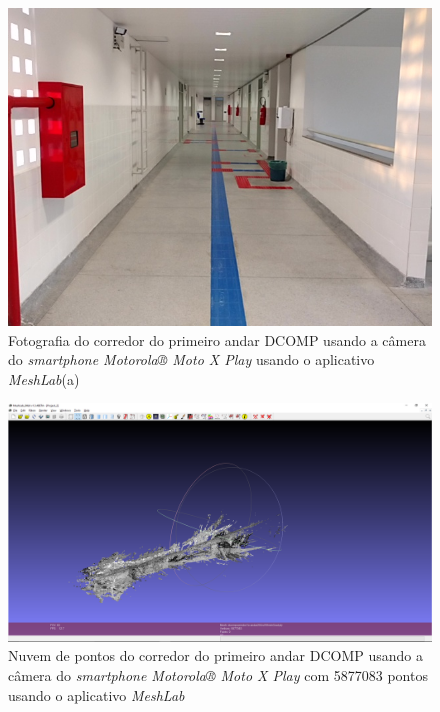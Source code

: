 \begin{figure}[H]
	\centering
		\includegraphics[width= \textwidth]{Imagens/scene00087.jpg}
	\caption{Fotografia do corredor do primeiro andar DCOMP usando a câmera do \textit{smartphone Motorola® Moto X Play} usando o aplicativo \textit{MeshLab}(a)}
\end{figure}

\begin{figure}[H]
	\centering
		\includegraphics[width= \textwidth]{Imagens/corredorMotox.PNG}
	\caption{Nuvem de pontos do corredor do primeiro andar DCOMP usando a câmera do \textit{smartphone Motorola® Moto X Play} com 5877083 pontos usando o aplicativo \textit{MeshLab}}
\end{figure}

